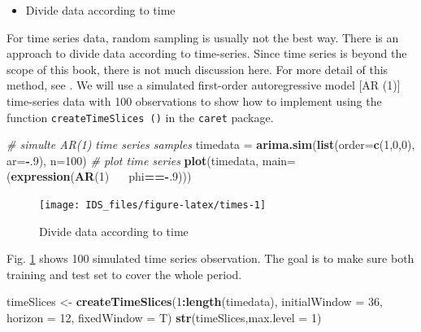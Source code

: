 \documentclass[12pt,]{krantz}
\makeatletter
\newenvironment{Shaded}{\begin{snugshade}}{\end{snugshade}}
\newcommand{\CommentTok}[1]{\textcolor[rgb]{0.37,0.37,0.37}{\textit{#1}}}
\newcommand{\DataTypeTok}[1]{\textcolor[rgb]{0.27,0.27,0.27}{#1}}
\newcommand{\DecValTok}[1]{\textcolor[rgb]{0.06,0.06,0.06}{#1}}
\newcommand{\ErrorTok}[1]{\textcolor[rgb]{0.14,0.14,0.14}{\textbf{#1}}}
\newcommand{\KeywordTok}[1]{\textcolor[rgb]{0.27,0.27,0.27}{\textbf{#1}}}
\newcommand{\NormalTok}[1]{#1}
\newcommand{\OperatorTok}[1]{\textcolor[rgb]{0.43,0.43,0.43}{\textbf{#1}}}
\newcommand{\StringTok}[1]{\textcolor[rgb]{0.5,0.5,0.5}{#1}}
\providecommand{\tightlist}{%
  \setlength{\itemsep}{0pt}\setlength{\parskip}{0pt}}
\newenvironment{kframe}{%
\medskip{}
\setlength{\fboxsep}{.8em}
 \def\at@end@of@kframe{}%
 \ifinner\ifhmode%
  \def\at@end@of@kframe{\end{minipage}}%
  \begin{minipage}{\columnwidth}%
 \fi\fi%
 \def\FrameCommand##1{\hskip\@totalleftmargin \hskip-\fboxsep
 \colorbox{shadecolor}{##1}\hskip-\fboxsep
     \hskip-\linewidth \hskip-\@totalleftmargin \hskip\columnwidth}%
 \MakeFramed {\advance\hsize-\width
   \@totalleftmargin\z@ \linewidth\hsize
   \@setminipage}}%
 {\par\unskip\endMakeFramed%
 \at@end@of@kframe}
\renewenvironment{Shaded}{\begin{kframe}}{\end{kframe}}
\makeatother
\begin{document}
\begin{itemize}
\tightlist
\item
  Divide data according to time
\end{itemize}

For time series data, random sampling is usually not the best way. There is an approach to divide data according to time-series. Since time series is beyond the scope of this book, there is not much discussion here. For more detail of this method, see \citep{Hyndman}. We will use a simulated first-order autoregressive model {[}AR (1){]} time-series data with 100 observations to show how to implement using the function \texttt{createTimeSlices\ ()} in the \texttt{caret} package.

\begin{Shaded}
\begin{Highlighting}[]
\CommentTok{# simulte AR(1) time series samples}
\NormalTok{timedata =}\StringTok{ }\KeywordTok{arima.sim}\NormalTok{(}\KeywordTok{list}\NormalTok{(}\DataTypeTok{order=}\KeywordTok{c}\NormalTok{(}\DecValTok{1}\NormalTok{,}\DecValTok{0}\NormalTok{,}\DecValTok{0}\NormalTok{), }\DataTypeTok{ar=}\OperatorTok{-}\NormalTok{.}\DecValTok{9}\NormalTok{), }\DataTypeTok{n=}\DecValTok{100}\NormalTok{)}
\CommentTok{# plot time series}
\KeywordTok{plot}\NormalTok{(timedata, }\DataTypeTok{main=}\NormalTok{(}\KeywordTok{expression}\NormalTok{(}\KeywordTok{AR}\NormalTok{(}\DecValTok{1}\NormalTok{)}\OperatorTok{~}\ErrorTok{~~}\NormalTok{phi}\OperatorTok{==-}\NormalTok{.}\DecValTok{9}\NormalTok{)))     }
\end{Highlighting}
\end{Shaded}

\begin{figure}

{\centering \texttt{[image: IDS\_files/figure-latex/times-1]} 

}

\caption{Divide data according to time}\label{fig:times}
\end{figure}

Fig. \ref{fig:times} shows 100 simulated time series observation. The goal is to make sure both training and test set to cover the whole period.

\begin{Shaded}
\begin{Highlighting}[]
\NormalTok{timeSlices <-}\StringTok{ }\KeywordTok{createTimeSlices}\NormalTok{(}\DecValTok{1}\OperatorTok{:}\KeywordTok{length}\NormalTok{(timedata), }
                   \DataTypeTok{initialWindow =} \DecValTok{36}\NormalTok{, }
                   \DataTypeTok{horizon =} \DecValTok{12}\NormalTok{, }
                   \DataTypeTok{fixedWindow =}\NormalTok{ T)}
\KeywordTok{str}\NormalTok{(timeSlices,}\DataTypeTok{max.level =} \DecValTok{1}\NormalTok{)}
\end{Highlighting}
\end{Shaded}
\end{document}
